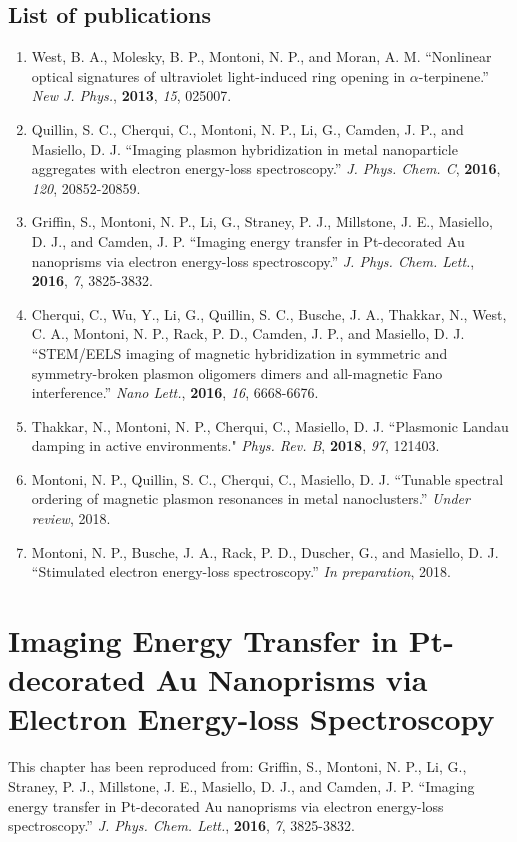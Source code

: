 \documentclass [11pt, proquest] {uwthesis}[2016/11/22]
\begin{document}
\section{List of publications}
\begin{enumerate}
\item West, B. A., Molesky, B. P., Montoni, N. P., and Moran, A. M. ``Nonlinear optical signatures of ultraviolet light-induced ring opening in $\alpha$-terpinene.'' {\it New J. Phys.}, {\bf 2013}, {\it 15}, 025007.
\item Quillin, S. C., Cherqui, C., Montoni, N. P., Li, G., Camden, J. P., and Masiello, D. J. ``Imaging plasmon hybridization in metal nanoparticle aggregates with electron energy-loss spectroscopy.'' {\it J. Phys. Chem. C}, {\bf 2016}, {\it 120}, 20852-20859.
\item Griffin, S., Montoni, N. P., Li, G., Straney, P. J., Millstone, J. E., Masiello, D. J., and Camden, J. P. ``Imaging energy transfer in Pt-decorated Au nanoprisms via electron energy-loss spectroscopy.'' {\it J. Phys. Chem. Lett.}, {\bf 2016}, {\it 7}, 3825-3832.
\item Cherqui, C., Wu, Y., Li, G., Quillin, S. C., Busche, J. A., Thakkar, N., West, C. A., Montoni, N. P., Rack, P. D., Camden, J. P., and Masiello, D. J. ``STEM/EELS imaging of magnetic hybridization in symmetric and symmetry-broken plasmon oligomers dimers and all-magnetic Fano interference.'' {\it Nano Lett.}, {\bf 2016}, {\it 16}, 6668-6676. 
\item Thakkar, N., Montoni, N. P., Cherqui, C., Masiello, D. J. ``Plasmonic Landau damping in active environments." {\it Phys. Rev. B}, {\bf 2018}, {\it 97}, 121403.
\item Montoni, N. P., Quillin, S. C., Cherqui, C., Masiello, D. J. ``Tunable spectral ordering of magnetic plasmon resonances in metal nanoclusters.'' {\it Under review}, 2018.
\item Montoni, N. P., Busche, J. A., Rack, P. D., Duscher, G., and Masiello, D. J. ``Stimulated electron energy-loss spectroscopy.'' {\it In preparation}, 2018.
\end{enumerate}
 
\chapter{Imaging Energy Transfer in Pt-decorated Au Nanoprisms via Electron Energy-loss Spectroscopy}

This chapter has been reproduced from:
 Griffin, S., Montoni, N. P., Li, G., Straney, P. J., Millstone, J. E., Masiello, D. J., and Camden, J. P. ``Imaging energy transfer in Pt-decorated Au nanoprisms via electron energy-loss spectroscopy.'' {\it J. Phys. Chem. Lett.}, {\bf 2016}, {\it 7}, 3825-3832.
\end{document}
